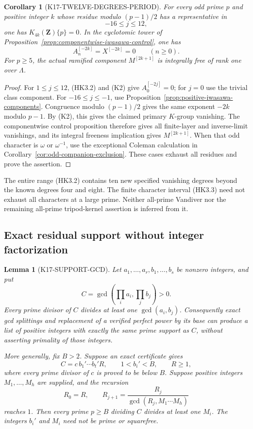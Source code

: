 \documentclass[11pt,a4paper]{article}
\newtheorem{lemma}[theorem]{Lemma}
\newtheorem{corollary}[theorem]{Corollary}
\theoremstyle{definition}
\begin{document}
\begin{corollary}[K17-TWELVE-DEGREES-PERIOD]
\label{cor:twelve-degrees-period}
For every odd prime $p$ and positive integer $k$ whose residue
modulo $(p-1)/2$ has a representative in
\[
                             -16\leq j\leq12,
 \tag{HK3.3}
\]
one has $K_{4k}(\mathbf Z)\{p\}=0$.
In the cyclotomic tower of
Proposition~\ref{prop:componentwise-iwasawa-control}, one has
\[
              A_n^{[-2k]}=X^{[-2k]}=0\qquad(n\geq0).
\]
For $p\geq5$, the actual ramified component $M^{[2k+1]}$
is integrally free of rank one over $\Lambda$.
\end{corollary}

\begin{proof}
For $1\leq j\leq12$, (HK3.2) and (K2) give
$A_0^{[-2j]}=0$; for $j=0$ use the trivial class component.
For $-16\leq j\leq-1$, use
Proposition~\ref{prop:positive-iwasawa-components}.
Congruence modulo $(p-1)/2$ gives the same exponent $-2k$
modulo $p-1$. By (K2), this gives the claimed primary
$K$-group vanishing. The componentwise control proposition therefore
gives all finite-layer and inverse-limit vanishings, and its
integral freeness implication gives $M^{[2k+1]}$.
When that odd character is $\omega$ or $\omega^{-1}$, use
the exceptional Coleman calculation in
Corollary~\ref{cor:odd-companion-exclusion}. These cases
exhaust all residues and prove the assertion.
\end{proof}

The entire range (HK3.2) contains ten new specified vanishing
degrees beyond the known degrees four and eight. The finite
character interval (HK3.3) need not exhaust all characters at
a large prime. Neither all-prime Vandiver nor the remaining
all-prime tripod-kernel assertion is inferred from it.

\subsection{Exact residual support without integer factorization}
\label{sec:residual-support-gcd}

\begin{lemma}[K17-SUPPORT-GCD]\label{lem:comparison-support-gcd}
Let \(a_1,\ldots,a_r,b_1,\ldots,b_s\) be nonzero integers, and put
\[
 C=\gcd\left(\prod_i a_i,\prod_j b_j\right)>0.
\]
Every prime divisor of \(C\) divides at least one
\(\gcd(a_i,b_j)\). Consequently exact gcd splittings and
replacement of a verified perfect power by its base can
produce a list of positive integers with exactly the same
prime support as \(C\), without asserting primality of those
integers.

More generally, fix \(B>2\). Suppose an exact certificate gives
\[
 C=c\,b_1'\cdots b_t'R,\qquad
 1<b_i'<B,\qquad R\ge1,
 \tag{RS.1}
\]
where every prime divisor of \(c\) is proved to be below \(B\).
Suppose positive integers \(M_1,\ldots,M_h\) are supplied, and
the recursion
\[
 R_0=R,\qquad
 R_{j+1}=\frac{R_j}{\gcd(R_j,M_1\cdots M_h)}
 \tag{RS.2}
\]
reaches \(1\). Then every prime \(p\ge B\) dividing \(C\)
divides at least one \(M_i\). The integers \(b_i'\) and \(M_i\)
need not be prime or squarefree.
\end{lemma}
\end{document}
